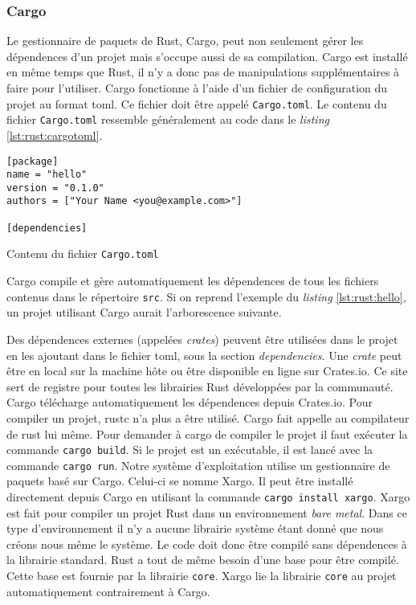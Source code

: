 \subsubsection{Cargo}
Le gestionnaire de paquets de Rust, Cargo, peut non seulement gérer les dépendences
d'un projet mais s'occupe aussi de sa compilation. Cargo est installé en même temps que
Rust, il n'y a donc pas de manipulations supplémentaires à faire pour
l'utiliser. Cargo fonctionne à l'aide d'un fichier de configuration du projet
au format \acrshort{toml}. Ce fichier doit être appelé \texttt{Cargo.toml}.
Le contenu du fichier \texttt{Cargo.toml} ressemble généralement
au code dans le \textit{listing} \ref{lst:rust:cargotoml}.

\begin{code}
\begin{verbatim}
[package]
name = "hello"
version = "0.1.0"
authors = ["Your Name <you@example.com>"]

[dependencies]
\end{verbatim}
\caption{Contenu du fichier \texttt{Cargo.toml}}
\label{lst:rust:cargotoml}
\end{code} \bigbreak

Cargo compile et gère automatiquement les dépendences de tous les fichiers contenus
dans le répertoire \texttt{src}. Si on reprend l'exemple du \textit{listing}
\ref{lst:rust:hello}, un projet utilisant Cargo aurait l'arborescence suivante. \\

 \bigbreak

Des dépendences externes (appelées \textit{crates}) peuvent être utilisées dans
le projet en les ajoutant dans le fichier \acrshort{toml}, sous la section \textit{dependencies}.
Une \textit{crate} peut être en local sur la machine hôte ou être disponible en ligne
sur Crates.io. Ce site sert de registre pour toutes les librairies Rust développées
par la communauté. Cargo télécharge automatiquement les dépendences depuis Crates.io.
Pour compiler un projet, rustc n'a plus a être utilisé. Cargo fait appelle au compilateur
de rust lui même. Pour demander à cargo de compiler le projet il faut exécuter
la commande \texttt{cargo build}. Si le projet est un exécutable,
il est lancé avec la commande \texttt{cargo run}. Notre système
d'exploitation utilise un gestionnaire de paquets basé sur Cargo. Celui-ci
se nomme Xargo. Il peut être installé directement depuis Cargo en utilisant
la commande \texttt{cargo install xargo}. Xargo est fait pour compiler
un projet Rust dans un environnement \textit{bare metal}. Dans ce type d'environnement
il n'y a aucune librairie système étant donné que nous créons nous même le système.
Le code doit donc être compilé sans dépendences à la librairie standard. Rust a tout
de même besoin d'une base pour être compilé. Cette base est fournie par la librairie
\texttt{core}. Xargo lie la librairie \texttt{core} au projet
automatiquement contrairement à Cargo.

